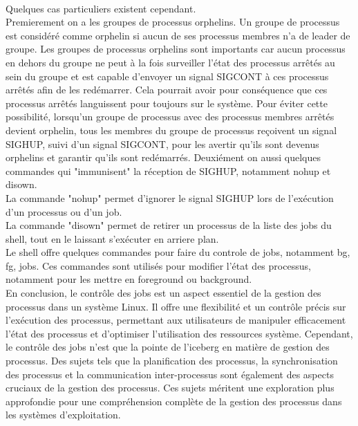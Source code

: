 \\
Quelques cas particuliers existent cependant.
\\ 
Premierement on a les groupes de processus orphelins. Un groupe de processus est considéré comme orphelin si aucun de ses processus 
membres n'a de leader de groupe. Les groupes de processus orphelins sont importants car aucun processus en dehors du groupe ne peut à la 
fois surveiller l'état des processus arrêtés au sein du groupe et est capable d'envoyer un signal SIGCONT à ces processus arrêtés afin 
de les redémarrer. Cela pourrait avoir pour conséquence que ces processus arrêtés languissent pour toujours sur le système. 
Pour éviter cette possibilité, lorsqu'un groupe de processus avec des processus membres arrêtés devient orphelin, tous les membres du 
groupe de processus reçoivent un signal SIGHUP, suivi d'un signal SIGCONT, pour les avertir qu'ils sont devenus orphelins et garantir qu'ils
sont redémarrés.
Deuxiément on aussi quelques commandes qui "immunisent" la réception de SIGHUP, notamment nohup et disown.
\\ 
La commande "nohup" permet d'ignorer le signal SIGHUP lors de l'exécution d'un processus ou d'un job.
\\ 
La commande "disown" permet de retirer un processus de la liste des jobs du shell, tout en le laissant s'exécuter en arriere plan.
\\ 
Le shell offre quelques commandes pour faire du controle de jobs, notamment bg, fg, jobs.
Ces commandes sont utilisés pour modifier l'état des processus, notamment pour les mettre en foreground ou background.
\\
En conclusion, le contrôle des jobs est un aspect essentiel de la gestion des processus dans un système Linux. Il offre une 
flexibilité et un contrôle précis sur l'exécution des processus, permettant aux utilisateurs de manipuler efficacement l'état des processus 
et d'optimiser l'utilisation des ressources système. Cependant, le contrôle des jobs n'est que la pointe de l'iceberg en matière de gestion des processus. 
Des sujets tels que la planification des processus, la synchronisation des processus et la communication inter-processus sont également des aspects cruciaux 
de la gestion des processus. Ces sujets méritent une exploration plus approfondie pour une compréhension complète de la gestion des processus dans les systèmes d'exploitation.
\\